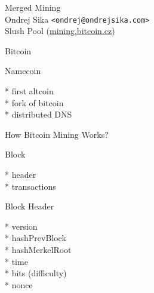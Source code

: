 \documentclass{beamer}
\begin{document}
\Large
\begin{frame}

    {\Huge Merged Mining}\\
    \vspace{7mm}
    {\LARGE Ondrej Sika \lstinline|<ondrej@ondrejsika.com>|}\\
    \vspace{7mm}
    {\Large Slush Pool (\url{mining.bitcoin.cz})}\\

\end{frame}

\begin{frame}

    {\Huge Bitcoin}\\

\end{frame}

\begin{frame}

    {\Huge Namecoin}\\

    \vspace{5mm}

    * first altcoin\\
    * fork of bitcoin\\
    * distributed DNS\\

\end{frame}

\begin{frame}

    {\Huge How Bitcoin Mining Works?}\\

\end{frame}

\begin{frame}

    {\Huge Block}\\

    \vspace{5mm}

    * header\\
    * transactions\\


\end{frame}

\begin{frame}

    {\Huge Block Header}\\

    \vspace{5mm}

    * version\\
    * hashPrevBlock\\
    * hashMerkelRoot\\
    * time\\
    * bits (difficulty)\\
    * nonce\\

\end{frame}
\end{document}
